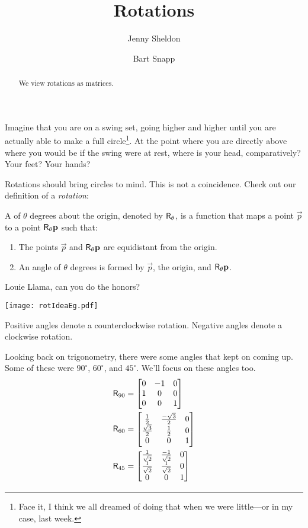 \documentclass{ximera}
\author{Jenny Sheldon \and Bart Snapp}
\title{Rotations}
\begin{document}
\begin{abstract}
  We view rotations as matrices.
\end{abstract}
\maketitle

Imagine that you are on a swing set, going higher and higher until you
are actually able to make a full circle\footnote{Face it, I think we
  all dreamed of doing that when we were little---or in my case, last
  week.}. At the point where you are directly above where you would be
if the swing were at rest, where is your head, comparatively?  Your
feet?  Your hands?


Rotations should bring circles to mind. This is not a
coincidence. Check out our definition of a \textit{rotation}:

\begin{definition}
A  of $\theta$ degrees about the origin, denoted by
$\mathsf{R}_\theta$, is a function that maps a point $\vec{p}$ to a point
$\mathsf{R}_\theta \mathbf{p}$ such that:
\begin{enumerate}
\item The points $\vec{p}$ and $\mathsf{R}_\theta \mathbf{p}$ are equidistant
  from the origin.
\item An angle of $\theta$ degrees is formed by $\vec{p}$, the origin, and
  $\mathsf{R}_\theta\mathbf{p}$.
\end{enumerate}
Louie Llama, can you do the honors?
\end{definition}
\begin{image}
\texttt{[image: rotIdeaEg.pdf]}
\end{image}
\begin{warning} 
Positive angles denote a counterclockwise rotation. Negative angles
denote a clockwise rotation.
\end{warning}

Looking back on trigonometry, there were some angles that kept on
coming up. Some of these were $90^\circ$, $60^\circ$, and $45^\circ$.
We'll focus on these angles too.
\begin{align*}
\mathsf{R}_{90} &=
\begin{bmatrix}
0 & -1 & 0\\
1 & 0 & 0\\
0 & 0 & 1
\end{bmatrix}\\
\mathsf{R}_{60} &=
\begin{bmatrix}
\frac{1}{2} & \frac{-\sqrt{3}}{2} & 0\\
\frac{\sqrt{3}}{2} & \frac{1}{2} & 0\\
0 & 0 & 1
\end{bmatrix}\\
\mathsf{R}_{45} &=
\begin{bmatrix}
\frac{1}{\sqrt{2}} & \frac{-1}{\sqrt{2}} & 0\\
\frac{1}{\sqrt{2}} & \frac{1}{\sqrt{2}} & 0\\
0 & 0 & 1
\end{bmatrix}
\end{align*}
\end{document}
